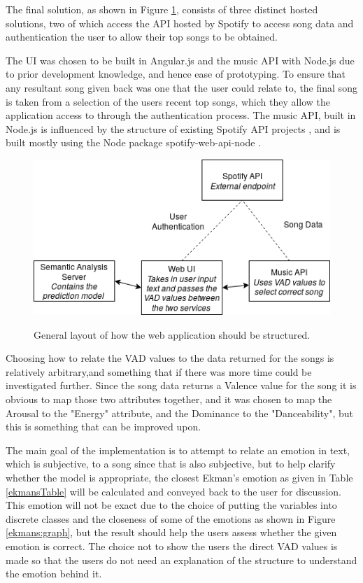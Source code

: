 The final solution, as shown in Figure \ref{implementationLayout}, consists of three distinct hosted solutions, two of which access the API hosted by Spotify to access song data and authentication the user to allow their top songs to be obtained.

The UI was chosen to be built in Angular.js and the music API with Node.js due to prior development knowledge, and hence ease of prototyping. 
To ensure that any resultant song given back was one that the user could relate to, the final song is taken from a selection of the users recent top songs, which they allow the application access to through the authentication process.
The music API, built in Node.js is influenced by the structure of existing Spotify API projects \cite{moodtape}, and is built mostly using the Node package spotify-web-api-node \cite{nodeSpotify}.

\begin{figure}[ht]
\caption{General layout of how the web application should be structured.}
\centering
\includegraphics[scale=0.6]{litImgs/interfaceLayout.png}
\label{implementationLayout}
\end{figure}

Choosing how to relate the VAD values to the data returned for the songs is relatively arbitrary,and something that if there was more time could be investigated further. Since the song data returns a Valence value for the song it is obvious to map those two attributes together, and it was chosen to map the Arousal to the "Energy" attribute, and the Dominance to the "Danceability", but this is something that can be improved upon.

The main goal of the implementation is to attempt to relate an emotion in text, which is subjective, to a song since that is also subjective, but to help clarify whether the model is appropriate, the closest Ekman's emotion as given in Table \ref{ekmansTable} will be calculated and conveyed back to the user for discussion. This emotion will not be exact due to the choice of putting the variables into discrete classes and the closeness of some of the emotions as shown in Figure \ref{ekmans:graph}, but the result should help the users assess whether the given emotion is correct. The choice not to show the users the direct VAD values is made so that the users do not need an explanation of the structure to understand the emotion behind it.

